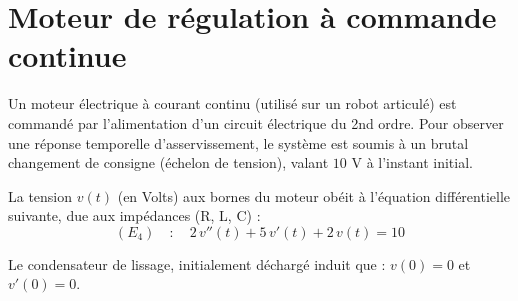 \documentclass[a4paper,11pt]{article}
\begin{document}
\section{Moteur de régulation à commande continue}

Un moteur électrique à courant continu (utilisé sur un robot articulé) est commandé par l'alimentation d'un circuit électrique du 2nd ordre. Pour observer une réponse temporelle d'asservissement, le système est soumis à un brutal changement de consigne (échelon de tension), valant $10 \text{ V}$ à l'instant initial.

La tension $v(t)$ (en Volts) aux bornes du moteur obéit à l'équation différentielle suivante, due aux impédances (R, L, C) :
\[
(E_4) \quad : \quad 2\,v''(t) + 5\,v'(t) + 2\,v(t) = 10
\]

Le condensateur de lissage, initialement déchargé induit que :
$v(0) = 0$ et $v'(0) = 0$.
\end{document}
